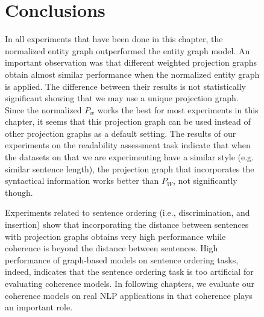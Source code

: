 \begin{figure}[!t]

\section{Conclusions}
%
In all experiments that have been done in this chapter, the normalized entity graph outperformed the entity graph model. 
An important observation was that different weighted projection graphs obtain almost similar performance when the normalized entity graph is applied. 
The difference between their results is not statistically significant showing that we may use a unique projection graph. 
Since the normalized $P_w$ works the best for most experiments in this chapter, it seems that this projection graph can be used instead of other projection graphs as a default setting. 
The results of our experiments on the readability assessment task indicate that when the datasets on that we are experimenting have a similar style (e.g. similar sentence length), the projection graph that incorporates the syntactical information works better than $P_W$, not significantly though. 

Experiments related to sentence ordering (i.e., discrimination, and insertion) show that  incorporating the distance between sentences with projection graphs obtains very high performance while coherence is beyond the distance between sentences. 
High performance of graph-based models on sentence ordering tasks, indeed, indicates that the sentence ordering task is too artificial for evaluating coherence models. 
In following chapters, we evaluate our coherence models on real NLP applications in that coherence plays an important role. 


\end{figure}
